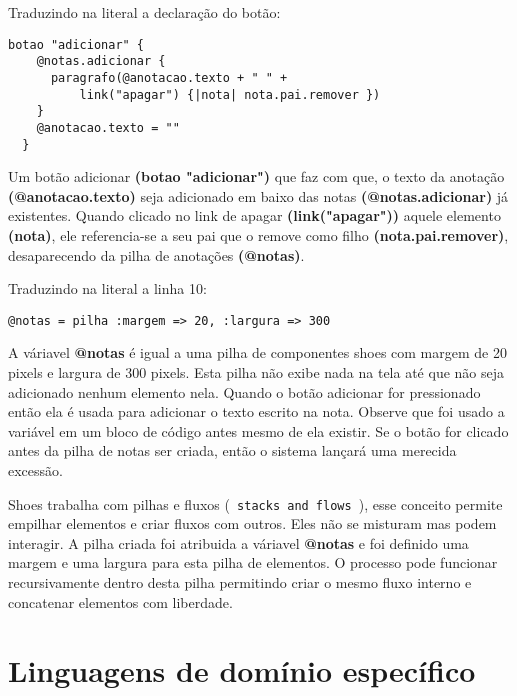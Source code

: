 \documentclass[espaco=simples,appendix=Name]{abnt}
\begin{document}
Traduzindo na literal a declaração do botão:

\begin{lstlisting}[caption=Botão adicionar - código traduzido]
  botao "adicionar" {  
    @notas.adicionar { 
      paragrafo(@anotacao.texto + " " + 
          link("apagar") {|nota| nota.pai.remover })
    }  
    @anotacao.texto = ""
  } 
\end{lstlisting}

Um botão adicionar \textbf{(botao "adicionar")} que faz com que, o texto da anotação \textbf{(@anotacao.texto)} seja adicionado em baixo das notas \textbf{(@notas.adicionar)} já existentes. Quando clicado no link de apagar \textbf{(link("apagar"))} aquele elemento \textbf{(nota)}, ele referencia-se a seu pai que o remove como filho \textbf{(nota.pai.remover)}, desaparecendo da pilha de anotações \textbf{(@notas)}.

 

Traduzindo na literal a linha 10:

\begin{lstlisting}[caption=Entendendo a pilha de componentes]
  @notas = pilha :margem => 20, :largura => 300
\end{lstlisting}

A váriavel \textbf{@notas} é igual a uma pilha de componentes shoes com margem de 20 pixels e largura de 300 pixels. Esta pilha não exibe nada na tela até que não seja adicionado nenhum elemento nela. Quando o botão adicionar for pressionado então ela é usada para adicionar o texto escrito na nota. Observe que foi usado a variável em um bloco de código antes mesmo de ela existir. Se o botão for clicado antes da pilha de notas ser criada, então o sistema lançará uma merecida excessão. 

Shoes trabalha com pilhas e fluxos (\texttt{ stacks and flows }), esse conceito permite empilhar elementos e criar fluxos com outros. Eles não se misturam mas podem interagir. A pilha criada foi atribuida a váriavel \textbf{ @notas } e foi definido uma margem e uma largura para esta pilha de elementos. O processo pode funcionar recursivamente dentro desta pilha permitindo criar o mesmo fluxo interno e concatenar elementos com liberdade.

\chapter { Linguagens de domínio específico }
\end{document}
